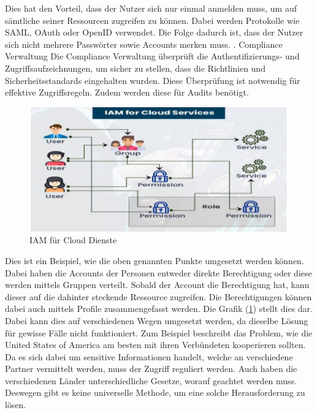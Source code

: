 Dies hat den Vorteil, dass der Nutzer sich nur einmal anmelden muss, um auf sämtliche seiner Ressourcen zugreifen zu können.
Dabei werden Protokolle wie SAML, OAuth oder OpenID verwendet.
Die Folge dadurch ist, dass der Nutzer sich nicht mehrere Passwörter sowie Accounts merken muss. \cite[1482]{IamIEEE}
\newline
{}. Compliance Verwaltung
\newline
Die Compliance Verwaltung überprüft die Authentifizierungs- und Zugriffsaufzeichnungen, um sicher zu stellen, dass die Richtlinien und Sicherheitsstandards eingehalten wurden.
Diese Überprüfung ist notwendig für effektive Zugriffsregeln.
Zudem werden diese für Audits benötigt. \cite[1482]{IamIEEE} 
\newline
\newline
\begin{figure}[h!]
 \centering
 \includegraphics[width=1\textwidth]{gfx/Picture/IAMISH.PNG}
 \caption{IAM für Cloud Dienste \cite[3]{Moha19}}
 \label{fig:IMAISH}
\end{figure}
Dies ist ein Beispiel, wie die oben genannten Punkte umgesetzt werden können.
Dabei haben die Accounts der Personen entweder direkte Berechtigung oder diese werden mittels Gruppen verteilt.
Sobald der Account die Berechtigung hat, kann dieser auf die dahinter steckende Ressource zugreifen.
Die Berechtigungen können dabei auch mittels Profile zusammengefasst werden.
Die Grafik (\ref{fig:IMAISH}) stellt dies dar.
\newline
Dabei kann dies auf verschiedenen Wegen umgesetzt werden, da dieselbe Lösung für gewisse Fälle nicht funktioniert.
Zum Beispiel beschreibt \cite[208]{Cal17} das Problem, wie die United States of America am besten mit ihren Verbündeten kooperieren sollten.
Da es sich dabei um sensitive Informationen handelt, welche an verschiedene Partner vermittelt werden, muss der Zugriff reguliert werden.
Auch haben die verschiedenen Länder unterschiedliche Gesetze, worauf geachtet werden muss. 
Deswegen gibt es keine universelle Methode, um eine solche Herausforderung zu lösen. \cite[208]{Cal17}


